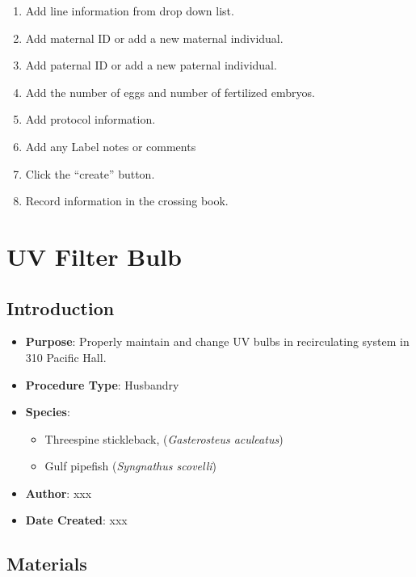 \documentclass[
  letterpaper,
  DIV=11,
  numbers=noendperiod]{scrreprt}
\providecommand{\tightlist}{%
  \setlength{\itemsep}{0pt}\setlength{\parskip}{0pt}}\usepackage{longtable,booktabs,array}
\begin{document}
\begin{enumerate}
\def\labelenumi{\arabic{enumi}.}
\setcounter{enumi}{4}
\tightlist
\item
  Add line information from drop down list.
\item
  Add maternal ID or add a new maternal individual.
\item
  Add paternal ID or add a new paternal individual.
\item
  Add the number of eggs and number of fertilized embryos.
\item
  Add protocol information.
\item
  Add any Label notes or comments
\item
  Click the ``create'' button.
\item
  Record information in the crossing book.
\end{enumerate}

\hypertarget{sec-husb-UV_bulb}{%
\chapter{UV Filter Bulb}\label{sec-husb-UV_bulb}}

\hypertarget{introduction-16}{%
\section{Introduction}\label{introduction-16}}

\begin{itemize}
\tightlist
\item
  \textbf{Purpose}: Properly maintain and change UV bulbs in
  recirculating system in 310 Pacific Hall.
\item
  \textbf{Procedure Type}: Husbandry
\item
  \textbf{Species}:

  \begin{itemize}
  \tightlist
  \item
    Threespine stickleback, (\emph{Gasterosteus aculeatus})
  \item
    Gulf pipefish (\emph{Syngnathus scovelli})
  \end{itemize}
\item
  \textbf{Author}: xxx
\item
  \textbf{Date Created}: xxx
\end{itemize}

\hypertarget{materials-14}{%
\section{Materials}\label{materials-14}}
\end{document}
